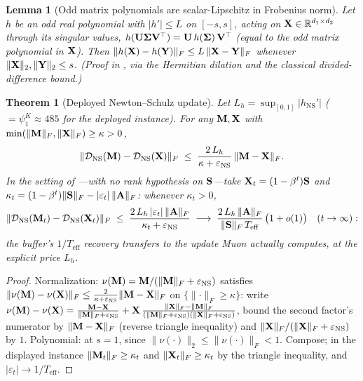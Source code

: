 \documentclass[11pt,a4paper]{article}
\newtheorem{theorem}{Theorem}
\newtheorem{lemma}{Lemma}
\theoremstyle{remark}
\newcommand{\Teff}{T_{\mathrm{eff}}}
\begin{document}
\begin{lemma}[Odd matrix polynomials are scalar-Lipschitz in Frobenius norm]
\label{lem:oddlip}
Let $h$ be an odd real polynomial with $\lvert h'\rvert\le L$ on $[-s,s]$, acting on $\mathbf{X}\in\mathbb{R}^{d_1\times d_2}$ through its singular values, $h(\mathbf{U}\bm{\Sigma}\mathbf{V}^\top)=\mathbf{U}\,h(\bm{\Sigma})\,\mathbf{V}^\top$ (equal to the odd matrix polynomial in $\mathbf{X}$).
Then $\lVert h(\mathbf{X})-h(\mathbf{Y})\rVert_F\le L\,\lVert\mathbf{X}-\mathbf{Y}\rVert_F$ whenever $\lVert\mathbf{X}\rVert_2,\lVert\mathbf{Y}\rVert_2\le s$.
(Proof in , via the Hermitian dilation and the classical divided-difference bound.)
\end{lemma}

\begin{theorem}[Deployed Newton--Schulz update]
\label{thm:nsupdate}
Let $L_h=\sup_{[0,1]}\lvert h_{\mathrm{NS}}'\rvert$ ($=\psi_1^K\approx485$ for the deployed instance).
For any $\mathbf{M},\mathbf{X}$ with $\min(\lVert\mathbf{M}\rVert_F,\lVert\mathbf{X}\rVert_F)\ge\kappa>0$,
\[
\lVert\mathcal{D}_{\mathrm{NS}}(\mathbf{M})-\mathcal{D}_{\mathrm{NS}}(\mathbf{X})\rVert_F\;\le\;\frac{2\,L_h}{\kappa+\varepsilon_{\mathrm{NS}}}\,\lVert\mathbf{M}-\mathbf{X}\rVert_F .
\]
In the setting of ---with no rank hypothesis on $\mathbf{S}$---take $\mathbf{X}_t=(1-\beta^t)\mathbf{S}$ and $\kappa_t=(1-\beta^t)\lVert\mathbf{S}\rVert_F-\lvert\varepsilon_t\rvert\,\lVert\mathbf{A}\rVert_F$: whenever $\kappa_t>0$,
\[
\lVert\Dcal_{\mathrm{NS}}(\Mbf_t)-\Dcal_{\mathrm{NS}}(\Xbf_t)\rVert_F
\;\le\;\frac{2\,L_h\,\lvert\varepsilon_t\rvert\,\lVert\Abf\rVert_F}{\kappa_t+\varepsilon_{\mathrm{NS}}}
\;\longrightarrow\;\frac{2\,L_h\,\lVert\Abf\rVert_F}{\lVert\Sbf\rVert_F\,\Teff}\,\bigl(1+o(1)\bigr)\quad(t\to\infty):
\]
the buffer's $1/\Teff$ recovery transfers to the update Muon actually computes, at the explicit price $L_h$.
\end{theorem}

\begin{proof}
Normalization: $\nu(\mathbf{M})=\mathbf{M}/(\lVert\mathbf{M}\rVert_F+\varepsilon_{\mathrm{NS}})$ satisfies $\lVert\nu(\mathbf{M})-\nu(\mathbf{X})\rVert_F\le\tfrac{2}{\kappa+\varepsilon_{\mathrm{NS}}}\lVert\mathbf{M}-\mathbf{X}\rVert_F$ on $\{\lVert\cdot\rVert_F\ge\kappa\}$: write $\nu(\mathbf{M})-\nu(\mathbf{X})=\tfrac{\mathbf{M}-\mathbf{X}}{\lVert\mathbf{M}\rVert_F+\varepsilon_{\mathrm{NS}}}+\mathbf{X}\,\tfrac{\lVert\mathbf{X}\rVert_F-\lVert\mathbf{M}\rVert_F}{(\lVert\mathbf{M}\rVert_F+\varepsilon_{\mathrm{NS}})(\lVert\mathbf{X}\rVert_F+\varepsilon_{\mathrm{NS}})}$, bound the second factor's numerator by $\lVert\mathbf{M}-\mathbf{X}\rVert_F$ (reverse triangle inequality) and $\lVert\mathbf{X}\rVert_F/(\lVert\mathbf{X}\rVert_F+\varepsilon_{\mathrm{NS}})$ by $1$.
Polynomial:  at $s=1$, since $\lVert\nu(\cdot)\rVert_2\le\lVert\nu(\cdot)\rVert_F<1$.
Compose; in the displayed instance $\lVert\mathbf{M}_t\rVert_F\ge\kappa_t$ and $\lVert\mathbf{X}_t\rVert_F\ge\kappa_t$ by the triangle inequality, and $\lvert\varepsilon_t\rvert\to1/\Teff$.
\end{proof}
\end{document}
